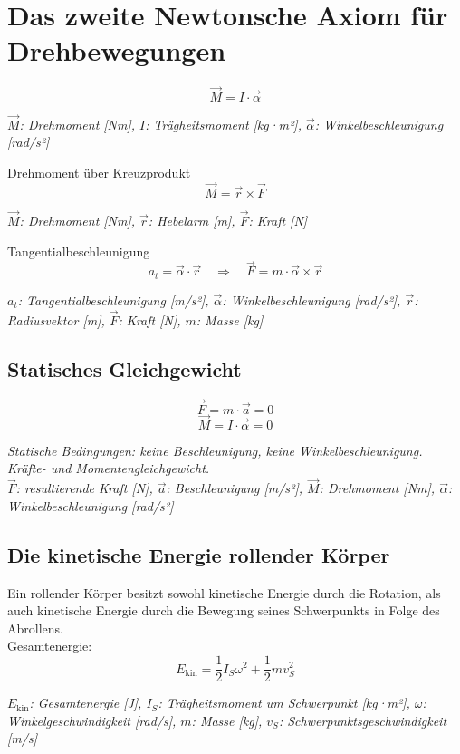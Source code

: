 \documentclass[a4paper,10pt]{article}
\newenvironment{displayformula}
{
	\begin{framed}
		\color{formulaColor}
	}
	{\end{framed}}
\newcommand{\formulalegend}[1]{%
	\par\vspace{0.5ex}%
	{{\color{legendColor}\RaggedRight\small\textit{#1}}}%
	\par\vspace{1.5ex}%
}
\begin{document}
\section{Das zweite Newtonsche Axiom für Drehbewegungen}

\begin{displayformula}
	\[
	\vec{M} = I \cdot \vec{\alpha}
	\]
\end{displayformula}
\formulalegend{
	\( \vec{M} \): Drehmoment [Nm], \( I \): Trägheitsmoment [kg·m²], \( \vec{\alpha} \): Winkelbeschleunigung [rad/s²]
}

\begin{displayformula}
	Drehmoment über Kreuzprodukt
	\[
	\vec{M} = \vec{r} \times \vec{F}
	\]
\end{displayformula}
\formulalegend{
	\( \vec{M} \): Drehmoment [Nm], \( \vec{r} \): Hebelarm [m], \( \vec{F} \): Kraft [N]
}

\begin{displayformula}
	Tangentialbeschleunigung
	\[
	a_t = \vec{\alpha} \cdot \vec{r} \quad \Rightarrow \quad \vec{F} = m \cdot \vec{\alpha} \times \vec{r}
	\]
\end{displayformula}
\formulalegend{
	\( a_t \): Tangentialbeschleunigung [m/s²], \( \vec{\alpha} \): Winkelbeschleunigung [rad/s²], \( \vec{r} \): Radiusvektor [m], \( \vec{F} \): Kraft [N], \( m \): Masse [kg]
}

\subsection{Statisches Gleichgewicht}

\begin{displayformula}
	\[
	\vec{F} = m \cdot \vec{a} = 0
	\]
	\[
	\vec{M} = I \cdot \vec{\alpha} = 0
	\]
\end{displayformula}
\formulalegend{
	Statische Bedingungen: keine Beschleunigung, keine Winkelbeschleunigung. Kräfte- und Momentengleichgewicht.\\
	\( \vec{F} \): resultierende Kraft [N], \( \vec{a} \): Beschleunigung [m/s²], \( \vec{M} \): Drehmoment [Nm], \( \vec{\alpha} \): Winkelbeschleunigung [rad/s²]
}

\subsection{Die kinetische Energie rollender Körper}

\begin{displayformula}
	Ein rollender Körper besitzt sowohl kinetische Energie durch die Rotation, als auch kinetische Energie durch die Bewegung seines Schwerpunkts in Folge des Abrollens. \\ 
	Gesamtenergie:
	\[
	E_{\text{kin}} = \frac{1}{2} I_S \omega^2 + \frac{1}{2} m v_S^2
	\]
\end{displayformula}
\formulalegend{
	\( E_{\text{kin}} \): Gesamtenergie [J], \( I_S \): Trägheitsmoment um Schwerpunkt [kg·m²], \( \omega \): Winkelgeschwindigkeit [rad/s], \( m \): Masse [kg], \( v_S \): Schwerpunktsgeschwindigkeit [m/s]
}
\end{document}
